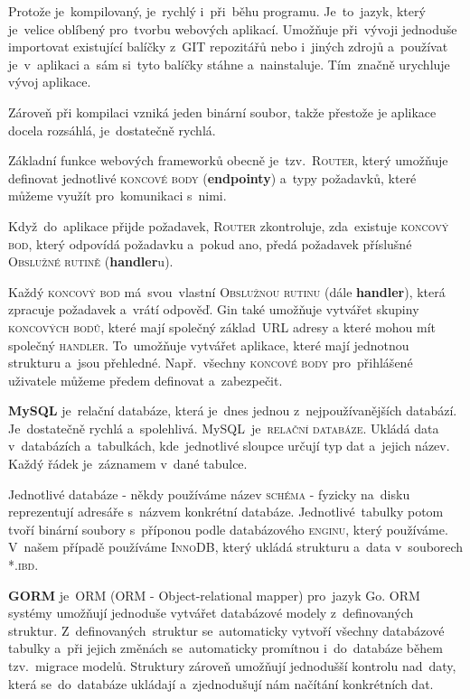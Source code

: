 \documentclass[14pt,a4paper]{article}
\begin{document}
            Protože je~kompilovaný, je~rychlý i~při~běhu programu. Je~to~jazyk, který je~velice oblíbený pro~tvorbu webových aplikací. Umožňuje při~vývoji jednoduše importovat existující balíčky z~GIT repozitářů nebo i~jiných zdrojů a~používat je~v~aplikaci a~sám si~tyto balíčky stáhne a~nainstaluje. Tím~značně urychluje vývoj aplikace.

            Zároveň při kompilaci vzniká jeden binární soubor, takže přestože je aplikace docela rozsáhlá, je~dostatečně rychlá.

            Základní funkce webových frameworků obecně je~tzv.~\textsc{Router}, který umožňuje definovat jednotlivé \textsc{koncové body} (\textbf{endpointy}) a~typy požadavků, které můžeme využít pro~komunikaci s~nimi.
            
            Když~do~aplikace přijde požadavek, \textsc{Router} zkontroluje, zda~existuje \textsc{koncový bod}, který odpovídá požadavku a~pokud ano, předá požadavek příslušné \textsc{Obslužné rutině} (\textbf{handler}u).

            Každý \textsc{koncový bod} má~svou~vlastní \textsc{Obslužnou rutinu} (dále \textbf{handler}), která zpracuje požadavek a~vrátí odpověď.
            Gin také umožňuje vytvářet skupiny \textsc{koncových bodů}, které mají společný základ~URL adresy a které mohou mít společný \textsc{handler}.
            To~umožňuje vytvářet aplikace, které mají jednotnou strukturu a~jsou přehledné. Např.~všechny \textsc{koncové body} pro~přihlášené
            uživatele můžeme předem definovat a~zabezpečit.
            
            \textbf{MySQL} je~relační databáze, která je~dnes jednou z~nejpoužívanějších databází. Je~dostatečně rychlá a~spolehlivá. \parencite{databases21}
            MySQL~je~\textsc{relační databáze}. Ukládá data v~databázích a~tabulkách, kde~jednotlivé sloupce určují typ dat a~jejich název. Každý řádek je~záznamem v~dané tabulce.
            
            Jednotlivé databáze - někdy používáme název \textsc{schéma} - fyzicky na~disku reprezentují adresáře s~názvem konkrétní databáze. Jednotlivé~tabulky potom tvoří binární soubory s~příponou podle databázového \textsc{enginu}, který používáme. V~našem případě používáme \textsc{InnoDB}, který ukládá strukturu a~data v~souborech \textsc{*.ibd}. \parencite{MySQLInnoDB}
            
            \textbf{GORM} je~ORM (ORM - Object-relational mapper) pro~jazyk Go. \textsc{ORM} systémy umožňují jednoduše vytvářet databázové modely z~definovaných struktur. 
            Z~definovaných~struktur se~automaticky vytvoří všechny databázové tabulky a~při jejich změnách se~automaticky promítnou i~do~databáze během tzv.~migrace modelů.
            Struktury zároveň umožňují jednodušší kontrolu nad~daty, která se~do~databáze ukládají a~zjednodušují nám načítání konkrétních dat. \parencite{freecodecamp:orm}
\end{document}
